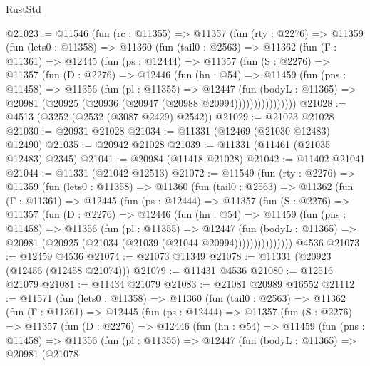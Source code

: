 \begin{lexlean}{RustStd}
\begin{coremodule}
@21023 := @11546
    (fun (rc : @11355) =>
    @11357
      (fun (rty : @2276) =>
      @11359
        (fun (lets0 : @11358) =>
        @11360
          (fun (tail0 : @2563) =>
          @11362
            (fun (Γ : @11361) =>
            @12445
              (fun (ps : @12444) =>
              @11357
                (fun (S : @2276) =>
                @11357
                  (fun (D : @2276) =>
                  @12446
                    (fun (hn : @54) =>
                    @11459
                      (fun (pns : @11458) =>
                      @11356
                        (fun (pl : @11355) =>
                        @12447
                          (fun (bodyL : @11365) =>
                          @20981 (@20925 (@20936 (@20947 (@20988 @20994))))))))))))))))
@21028 := @4513 (@3252 (@2532 (@3087 @2429) @2542))
@21029 := @21023 @21028
@21030 := @20931 @21028
@21034 := @11331 (@12469 (@21030 @12483) @12490)
@21035 := @20942 @21028
@21039 := @11331 (@11461 (@21035 @12483) @2345)
@21041 := @20984 (@11418 @21028)
@21042 := @11402 @21041
@21044 := @11331 (@21042 @12513)
@21072 := @11549
    (fun (rty : @2276) =>
    @11359
      (fun (lets0 : @11358) =>
      @11360
        (fun (tail0 : @2563) =>
        @11362
          (fun (Γ : @11361) =>
          @12445
            (fun (ps : @12444) =>
            @11357
              (fun (S : @2276) =>
              @11357
                (fun (D : @2276) =>
                @12446
                  (fun (hn : @54) =>
                  @11459
                    (fun (pns : @11458) =>
                    @11356
                      (fun (pl : @11355) =>
                      @12447
                        (fun (bodyL : @11365) =>
                        @20981 (@20925 (@21034 (@21039 (@21044 @20994)))))))))))))))
    @4536
@21073 := @12459 @4536
@21074 := @21073 @11349
@21078 := @11331 (@20923 (@12456 (@12458 @21074)))
@21079 := @11431 @4536
@21080 := @12516 @21079
@21081 := @11434 @21079
@21083 := @21081 @20989 @16552
@21112 := @11571
    (fun (lets0 : @11358) =>
    @11360
      (fun (tail0 : @2563) =>
      @11362
        (fun (Γ : @11361) =>
        @12445
          (fun (ps : @12444) =>
          @11357
            (fun (S : @2276) =>
            @11357
              (fun (D : @2276) =>
              @12446
                (fun (hn : @54) =>
                @11459
                  (fun (pns : @11458) =>
                  @11356
                    (fun (pl : @11355) =>
                    @12447
                      (fun (bodyL : @11365) =>
                      @20981
                        (@21078

\end{coremodule}
\end{lexlean}
